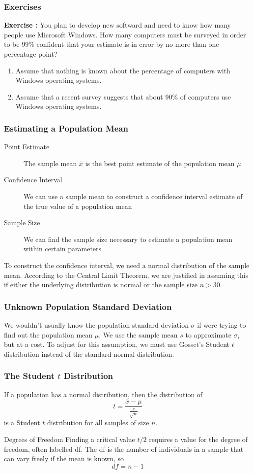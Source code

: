 \documentclass[xcolor=dvipsnames]{beamer}
\newcounter{exercise}
\newcommand{\ubung}[0]{\refstepcounter{exercise}\textbf{Exercise \arabic{exercise}: }}
\begin{document}
\begin{frame}
  \frametitle{Exercises}
{\ubung} You plan to develop new softward and need to know how many
people use Microsoft Windows. How many computers must be surveyed in
order to be 99\% confident that your estimate is in error by no more
than one percentage point?
\begin{enumerate}
\item Assume that nothing is known about the percentage of computers
  with Windows operating systems.
\item Assume that a recent survey suggests that about 90\% of
  computers use Windows operating systems.
\end{enumerate}
\end{frame}

\begin{frame}
  \frametitle{Estimating a Population Mean}
  \begin{description}
  \item[Point Estimate] The sample mean $\bar{x}$ is the best point
    estimate of the population mean $\mu$
  \item[Confidence Interval] We can use a sample mean to construct a
    confidence interval estimate of the true value of a population
    mean
  \item[Sample Size] We can find the sample size necessary to estimate
    a population mean within certain parameters
  \end{description}
To construct the confidence interval, we need a normal distribution of
the sample mean. According to the Central Limit Theorem, we are
justified in  assuming this if either the underlying distribution is
normal or the sample size $n>30$.
\end{frame}

\begin{frame}
  \frametitle{Unknown Population Standard Deviation}
We wouldn't usually know the population standard deviation $\sigma$ if
were trying to find out the population mean $\mu$. We use the sample
mean $s$ to approximate $\sigma$, but at a cost. To adjust for this
assumption, we must use Gosset's \alert{Student $t$ distribution}
instead of the standard normal distribution.
\end{frame}

\begin{frame}
  \frametitle{The Student $t$ Distribution}
If a population has a normal distribution, then the distribution of
\begin{equation}
  \label{eq:aungaecu}
  t=\frac{\bar{x}-\mu}{\frac{s}{\sqrt{n}}}
\end{equation}
is a Student $t$ distribution for all samples of size $n$. 
\begin{block}{Degrees of Freedom}
  Finding a critical value $t/2$ requires a value for the
  \alert{degree of freedom}, often labelled df. The df is the number
  of individuals in a sample that can vary freely if the mean is
  known, so
  \begin{equation}
    \label{eq:aepeidai}
    df=n-1
  \end{equation}
\end{block}
\end{frame}
\end{document}

